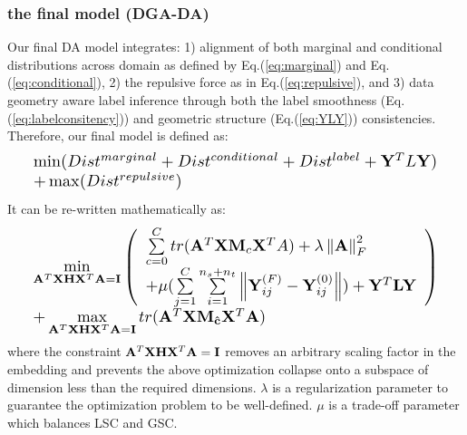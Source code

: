 \documentclass[journal,twocolumn]{IEEEtran}
\begin{document}
\begin{CJK*}{UTF8}{gkai}
\subsubsection{the final model (\textbf{DGA-DA})}
\label{subsubsection: the final model (DGA-DA)}
Our final DA model integrates: 1) alignment of both marginal and conditional distributions across domain as defined by Eq.(\ref{eq:marginal}) and Eq.(\ref{eq:conditional}), 2) the repulsive force as in Eq.(\ref{eq:repulsive}), and 3) data geometry aware label inference through  both the  label smoothness (Eq.(\ref{eq:labelconsitency})) and geometric structure (Eq.(\ref{eq:YLY})) consistencies. Therefore, our final model is defined as:
								\begin{equation}\label{eq:ours_physical}
									\resizebox{0.96\hsize}{!}{%
										$\begin{array}{*{20}{l}}
										{\min (Dis{t^{marginal}} + Dis{t^{conditional}} + Dis{t^{label}} + {{\bf{Y}}^T}L{\bf{Y}})}\\ + 
										\max (Dist^{repulsive})
										\end{array}$}
								\end{equation}
		\vspace{-2pt}					
It can be re-written mathematically as:
	\begin{equation}\label{eq:final model}
	\resizebox{1\hsize}{!}{%
		$\begin{array}{*{20}{l}}
		{\begin{array}{*{20}{l}}
			{\mathop {\min }\limits_{{{\bf{A}}^T}{\bf{XH}}{{\bf{X}}^T}{\bf{A}} = {\bf{I}}} \left( {\begin{array}{*{20}{l}}
					{\sum\limits_{c = 0}^C {tr({{\bf{A}}^T}{\bf{X}}{{\bf{M}}_c}{{\bf{X}}^T}A)}  + \lambda \left\| {\bf{A}} \right\|_F^2}\\
					{ + \mu (\sum\limits_{j = 1}^C {\sum\limits_{i = 1}^{{n_s} + {n_t}} {\left\| {{\bf{Y}}_{ij}^{(F)} - {\bf{Y}}_{ij}^{(0)}} \right\|} } ) + {{\bf{Y}}^T}{\bf{LY}}}
					\end{array}} \right)}\\
			{ + \mathop {\max }\limits_{{{\bf{A}}^T}{\bf{XH}}{{\bf{X}}^T}{\bf{A}} = {\bf{I}}} tr({{\bf{A}}^T}{\bf{X}}{{\bf{M}}_{{\bf{\hat c}}}}{{\bf{X}}^T}{\bf{A}})}
			\end{array}}
		\end{array}$}
\end{equation}
\vspace{-2pt}
where the constraint ${{{\bf{A}}^T}{\bf{XH}}{{\bf{X}}^T}{\bf{A}} = {\bf{I}}}$ removes an arbitrary scaling factor in the embedding and prevents the above optimization collapse onto a subspace of dimension less than the required dimensions. $\lambda$ is a regularization parameter to guarantee the optimization problem to be well-defined. $\mu $ is a trade-off parameter which balances LSC and GSC.
\vspace{-3pt}				

\end{CJK*}
\end{document}
